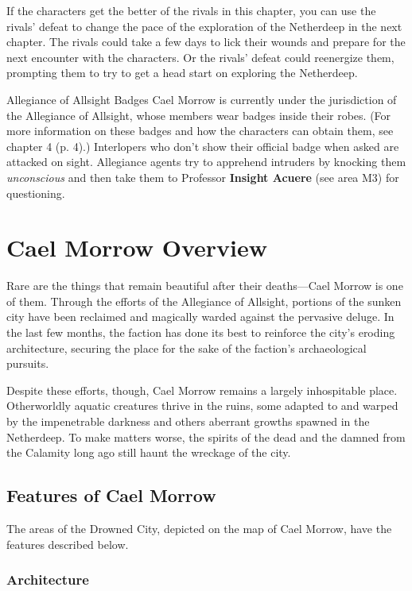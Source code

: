 \documentclass[letterpaper, 11pt, bg=full, twocolumn]{dndbook}
\begin{document}
If the characters get the better of the rivals in this chapter, you can use the rivals' defeat to change the pace of the exploration of the Netherdeep in the next chapter. The rivals could take a few days to lick their wounds and prepare for the next encounter with the characters. Or the rivals' defeat could reenergize them, prompting them to try to get a head start on exploring the Netherdeep.

\begin{DndSidebar}{Allegiance of Allsight Badges}
Cael Morrow is currently under the jurisdiction of the Allegiance of Allsight, whose members wear badges inside their robes. (For more information on these badges and how the characters can obtain them, see chapter 4 (p. 4).) Interlopers who don't show their official badge when asked are attacked on sight. Allegiance agents try to apprehend intruders by knocking them \textit{unconscious} and then take them to Professor \textbf{Insight Acuere} (see area M3) for questioning.
\end{DndSidebar}
\section{Cael Morrow Overview}

Rare are the things that remain beautiful after their deaths---Cael Morrow is one of them. Through the efforts of the Allegiance of Allsight, portions of the sunken city have been reclaimed and magically warded against the pervasive deluge. In the last few months, the faction has done its best to reinforce the city's eroding architecture, securing the place for the sake of the faction's archaeological pursuits.

Despite these efforts, though, Cael Morrow remains a largely inhospitable place. Otherworldly aquatic creatures thrive in the ruins, some adapted to and warped by the impenetrable darkness and others aberrant growths spawned in the Netherdeep. To make matters worse, the spirits of the dead and the damned from the Calamity long ago still haunt the wreckage of the city.

\subsection{Features of Cael Morrow}

The areas of the Drowned City, depicted on the map of Cael Morrow, have the features described below.

\subsubsection{Architecture}
\end{document}
